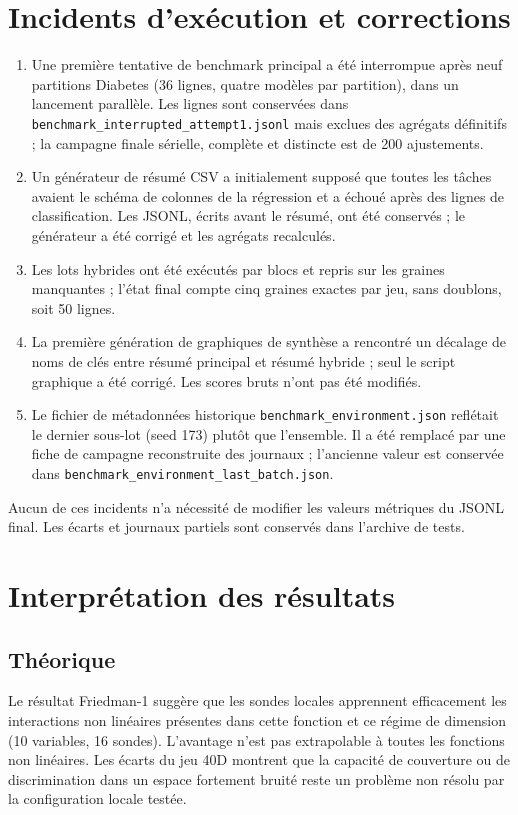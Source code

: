 \documentclass[11pt,a4paper]{article}
\begin{document}
\section{Incidents d'exécution et corrections}
\begin{enumerate}
\item Une première tentative de benchmark principal a été interrompue après neuf partitions Diabetes (36 lignes, quatre modèles par partition), dans un lancement parallèle. Les lignes sont conservées dans \texttt{benchmark\_interrupted\_attempt1.jsonl} mais exclues des agrégats définitifs ; la campagne finale sérielle, complète et distincte est de 200 ajustements.
\item Un générateur de résumé CSV a initialement supposé que toutes les tâches avaient le schéma de colonnes de la régression et a échoué après des lignes de classification. Les JSONL, écrits avant le résumé, ont été conservés ; le générateur a été corrigé et les agrégats recalculés.
\item Les lots hybrides ont été exécutés par blocs et repris sur les graines manquantes ; l'état final compte cinq graines exactes par jeu, sans doublons, soit 50 lignes.
\item La première génération de graphiques de synthèse a rencontré un décalage de noms de clés entre résumé principal et résumé hybride ; seul le script graphique a été corrigé. Les scores bruts n'ont pas été modifiés.
\item Le fichier de métadonnées historique \texttt{benchmark\_environment.json} reflétait le dernier sous-lot (seed 173) plutôt que l'ensemble. Il a été remplacé par une fiche de campagne reconstruite des journaux ; l'ancienne valeur est conservée dans \texttt{benchmark\_environment\_last\_batch.json}.
\end{enumerate}
Aucun de ces incidents n'a nécessité de modifier les valeurs métriques du JSONL final. Les écarts et journaux partiels sont conservés dans l'archive de tests.

\section{Interprétation des résultats}
\subsection{Théorique}
Le résultat Friedman-1 suggère que les sondes locales apprennent efficacement les interactions non linéaires présentes dans cette fonction et ce régime de dimension (10 variables, 16 sondes). L'avantage n'est pas extrapolable à toutes les fonctions non linéaires. Les écarts du jeu 40D montrent que la capacité de couverture ou de discrimination dans un espace fortement bruité reste un problème non résolu par la configuration locale testée.
\end{document}
